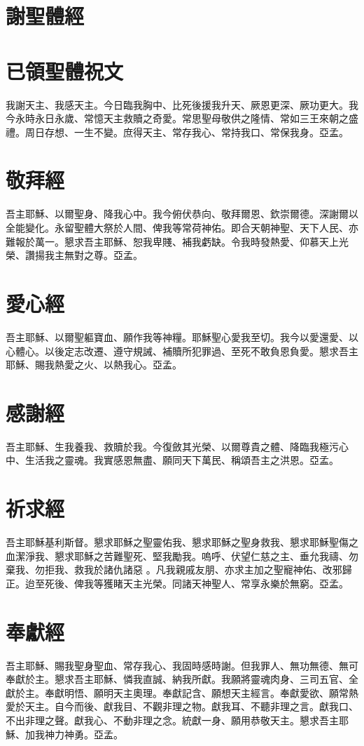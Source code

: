 \section*{謝聖體經}
\section*{已領聖體祝文}
我謝天主、我感天主。今日臨我胸中、比死後援我升天、厥恩更深、厥功更大。我今永時永日永歲、常憶天主救贖之奇愛。常思聖母敬供之隆情、常如三王來朝之盛禮。周日存想、一生不變。庶得天主、常存我心、常持我口、常保我身。{\cspace}亞孟。
\section*{敬拜經}
吾主耶穌、以爾聖身、降我心中。我今俯伏恭向、敬拜爾恩、欽崇爾德。深謝爾以全能變化。永留聖體大祭於人間、俾我等常荷神佑。即合天朝神聖、天下人民、亦難報於萬一。懇求吾主耶穌、恕我卑賤、補我虧缺。令我時發熱愛、仰慕天上光榮、讚揚我主無對之尊。{\cspace}亞孟。
\section*{愛心經}
吾主耶穌、以爾聖軀寶血、願作我等神糧。耶穌聖心愛我至切。我今以愛還愛、以心體心。以後定志改遷、遵守規誡、補贖所犯罪過、至死不敢負恩負愛。懇求吾主耶穌、賜我熱愛之火、以熱我心。{\cspace}亞孟。
\section*{感謝經}
吾主耶穌、生我養我、救贖於我。今復斂其光榮、以爾尊貴之體、降臨我極污心中、生活我之靈魂。我實感恩無盡、願同天下萬民、稱頌吾主之洪恩。{\cspace}亞孟。
\section*{祈求經}
吾主耶穌基利斯督。懇求耶穌之聖靈佑我、懇求耶穌之聖身救我、懇求耶穌聖傷之血潔淨我、懇求耶穌之苦難聖死、堅我勵我。嗚呼、伏望仁慈之主、垂允我禱、勿棄我、勿拒我、救我於諸仇諸惡 。凡我親戚友朋、亦求主加之聖寵神佑、改邪歸正。迨至死後、俾我等獲睹天主光榮。同諸天神聖人、常享永樂於無窮。{\cspace}亞孟。
\section*{奉獻經}
吾主耶穌、賜我聖身聖血、常存我心、我固時感時謝。但我罪人、無功無德、無可奉獻於主。懇求吾主耶穌、憐我直誠、納我所獻。我願將靈魂肉身、三司五官、全獻於主。奉獻明悟、願明天主奧理。奉獻記含、願想天主經言。奉獻愛欲、願常熱愛於天主。自今而後、獻我目、不觀非理之物。獻我耳、不聽非理之言。獻我口、不出非理之聲。獻我心、不動非理之念。統獻一身、願用恭敬天主。懇求吾主耶穌、加我神力神勇。{\cspace}亞孟。
